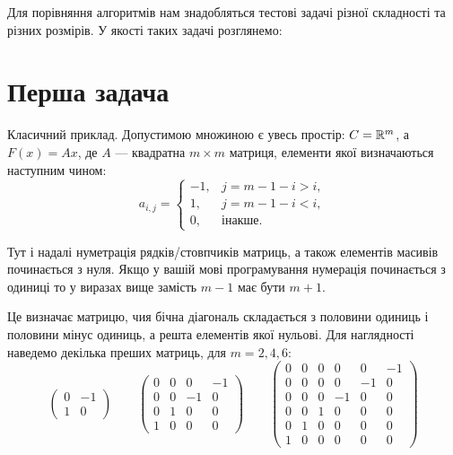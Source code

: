 Для порівняння алгоритмів нам знадобляться тестові задачі різної складності та різних розмірів. У якості таких задачі розглянемо:

\section{Перша задача}

Класичний приклад. Допустимою множиною є увесь простір: $C = \mathbb{R}^m$, а $F(x) = Ax$, де $A$ --- квадратна $m \times m$ матриця, елементи якої визначаються наступним чином:
\begin{equation}
    a_{i,j} = \begin{cases}
        -1, & j = m - 1 - i > i, \\
        1, & j = m - 1 - i < i, \\
        0, & \text{інакше}.
    \end{cases}
\end{equation}

\begin{remark}
    Тут і надалі нуметрація рядків/стовпчиків матриць, а також елементів масивів починається з нуля. Якщо у вашій мові програмування нумерація починається з одиниці то у виразах вище замість $m - 1$ має бути $m + 1$.
\end{remark}

Це визначає матрицю, чия бічна діагональ складається з половини одиниць і половини мінус одиниць, а решта елементів якої нульові. Для наглядності наведемо декілька преших матриць, для $m = 2, 4, 6$:
\begin{equation}
    \begin{pmatrix}
        0 & -1 \\
        1 & 0
    \end{pmatrix}
    \qquad
    \begin{pmatrix}
        0 & 0 & 0 & -1 \\
        0 & 0 & -1 & 0 \\
        0 & 1 & 0 & 0 \\
        1 & 0 & 0 & 0
    \end{pmatrix}
    \qquad
    \begin{pmatrix}
        0 & 0 & 0 & 0 & 0 & -1 \\
        0 & 0 & 0 & 0 & -1 & 0 \\
        0 & 0 & 0 & -1 & 0 & 0 \\
        0 & 0 & 1 & 0 & 0 & 0 \\
        0 & 1 & 0 & 0 & 0 & 0 \\
        1 & 0 & 0 & 0 & 0 & 0
    \end{pmatrix}
\end{equation}

